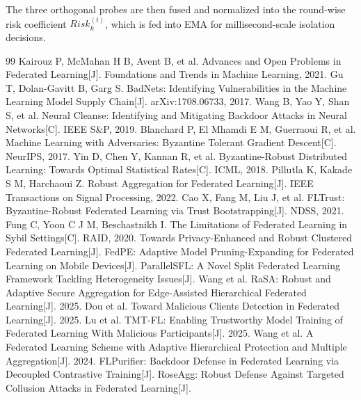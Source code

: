 \documentclass[runningheads]{llncs}
\begin{document}
The three orthogonal probes are then fused and normalized into the round-wise risk coefficient $Risk_{k}^{(t)}$, which is fed into EMA for millisecond-scale isolation decisions.

\begin{thebibliography}{99}
     Kairouz P, McMahan H B, Avent B, et al. Advances and Open Problems in Federated Learning[J]. Foundations and Trends in Machine Learning, 2021.
     Gu T, Dolan-Gavitt B, Garg S. BadNets: Identifying Vulnerabilities in the Machine Learning Model Supply Chain[J]. arXiv:1708.06733, 2017.
     Wang B, Yao Y, Shan S, et al. Neural Cleanse: Identifying and Mitigating Backdoor Attacks in Neural Networks[C]. IEEE S\&P, 2019.
     Blanchard P, El Mhamdi E M, Guerraoui R, et al. Machine Learning with Adversaries: Byzantine Tolerant Gradient Descent[C]. NeurIPS, 2017.
     Yin D, Chen Y, Kannan R, et al. Byzantine-Robust Distributed Learning: Towards Optimal Statistical Rates[C]. ICML, 2018.
     Pillutla K, Kakade S M, Harchaoui Z. Robust Aggregation for Federated Learning[J]. IEEE Transactions on Signal Processing, 2022.
     Cao X, Fang M, Liu J, et al. FLTrust: Byzantine-Robust Federated Learning via Trust Bootstrapping[J]. NDSS, 2021.
     Fung C, Yoon C J M, Beschastnikh I. The Limitations of Federated Learning in Sybil Settings[C]. RAID, 2020.
     Towards Privacy-Enhanced and Robust Clustered Federated Learning[J].
     FedPE: Adaptive Model Pruning-Expanding for Federated Learning on Mobile Devices[J].
     ParallelSFL: A Novel Split Federated Learning Framework Tackling Heterogeneity Issues[J].
     Wang et al. RaSA: Robust and Adaptive Secure Aggregation for Edge-Assisted Hierarchical Federated Learning[J]. 2025.
     Dou et al. Toward Malicious Clients Detection in Federated Learning[J]. 2025.
     Lu et al. TMT-FL: Enabling Trustworthy Model Training of Federated Learning With Malicious Participants[J]. 2025.
     Wang et al. A Federated Learning Scheme with Adaptive Hierarchical Protection and Multiple Aggregation[J]. 2024.
     FLPurifier: Backdoor Defense in Federated Learning via Decoupled Contrastive Training[J].
     RoseAgg: Robust Defense Against Targeted Collusion Attacks in Federated Learning[J].

\end{thebibliography}
\end{document}
